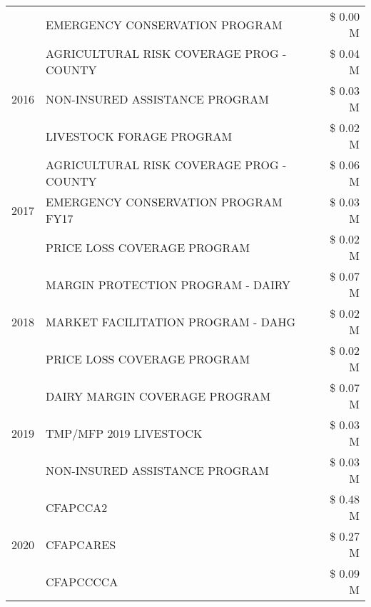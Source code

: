 \begin{tabular}{llr}
 & EMERGENCY CONSERVATION PROGRAM & \$ 0.00 M \\
\cline{1-3}
\multirow[t]{3}{*}{2016} & AGRICULTURAL RISK COVERAGE PROG - COUNTY & \$ 0.04 M \\
 & NON-INSURED ASSISTANCE PROGRAM & \$ 0.03 M \\
 & LIVESTOCK FORAGE PROGRAM & \$ 0.02 M \\
\cline{1-3}
\multirow[t]{3}{*}{2017} & AGRICULTURAL RISK COVERAGE PROG - COUNTY & \$ 0.06 M \\
 & EMERGENCY CONSERVATION PROGRAM FY17 & \$ 0.03 M \\
 & PRICE LOSS COVERAGE PROGRAM & \$ 0.02 M \\
\cline{1-3}
\multirow[t]{3}{*}{2018} & MARGIN PROTECTION PROGRAM - DAIRY & \$ 0.07 M \\
 & MARKET FACILITATION PROGRAM - DAHG & \$ 0.02 M \\
 & PRICE LOSS COVERAGE PROGRAM & \$ 0.02 M \\
\cline{1-3}
\multirow[t]{3}{*}{2019} & DAIRY MARGIN COVERAGE PROGRAM & \$ 0.07 M \\
 & TMP/MFP 2019 LIVESTOCK & \$ 0.03 M \\
 & NON-INSURED ASSISTANCE PROGRAM & \$ 0.03 M \\
\cline{1-3}
\multirow[t]{3}{*}{2020} & CFAPCCA2 & \$ 0.48 M \\
 & CFAPCARES & \$ 0.27 M \\
 & CFAPCCCCA & \$ 0.09 M \\
\cline{1-3}
\bottomrule
\end{tabular}
